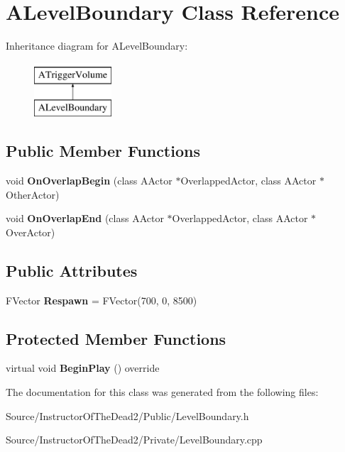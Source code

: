 \hypertarget{class_a_level_boundary}{}\section{A\+Level\+Boundary Class Reference}
\label{class_a_level_boundary}
Inheritance diagram for A\+Level\+Boundary\+:\begin{figure}[H]
\begin{center}
\leavevmode
\includegraphics[height=2.000000cm]{class_a_level_boundary}
\end{center}
\end{figure}
\subsection*{Public Member Functions}
\begin{DoxyCompactItemize}
\item 
\mbox{\label{class_a_level_boundary_af75a32e183b2fb04f37ef82596e7c812}} 
void {\bfseries On\+Overlap\+Begin} (class A\+Actor $\ast$Overlapped\+Actor, class A\+Actor $\ast$Other\+Actor)
\item 
\mbox{\label{class_a_level_boundary_a60671f338cc8ec077390965d975e0b20}} 
void {\bfseries On\+Overlap\+End} (class A\+Actor $\ast$Overlapped\+Actor, class A\+Actor $\ast$Over\+Actor)
\end{DoxyCompactItemize}
\subsection*{Public Attributes}
\begin{DoxyCompactItemize}
\item 
\mbox{\label{class_a_level_boundary_a87be1c7307ff07bd9ad6cf5a51baa7b2}} 
F\+Vector {\bfseries Respawn} = F\+Vector(700, 0, 8500)
\end{DoxyCompactItemize}
\subsection*{Protected Member Functions}
\begin{DoxyCompactItemize}
\item 
\mbox{\label{class_a_level_boundary_aacde6fc2bd8835587d940b4b23871841}} 
virtual void {\bfseries Begin\+Play} () override
\end{DoxyCompactItemize}


The documentation for this class was generated from the following files\+:\begin{DoxyCompactItemize}
\item 
Source/\+Instructor\+Of\+The\+Dead2/\+Public/Level\+Boundary.\+h\item 
Source/\+Instructor\+Of\+The\+Dead2/\+Private/Level\+Boundary.\+cpp\end{DoxyCompactItemize}
